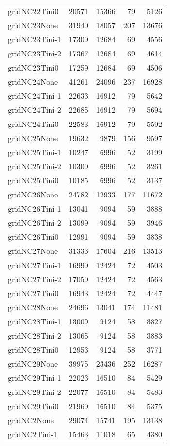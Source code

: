 \begin{longtable}{lrrrr}
gridNC22Tini0 & 20571 & 15366 & 79 & 5126 \\
gridNC23None & 31940 & 18057 & 207 & 13676 \\
gridNC23Tini-1 & 17309 & 12684 & 69 & 4556 \\
gridNC23Tini-2 & 17367 & 12684 & 69 & 4614 \\
gridNC23Tini0 & 17259 & 12684 & 69 & 4506 \\
gridNC24None & 41261 & 24096 & 237 & 16928 \\
gridNC24Tini-1 & 22633 & 16912 & 79 & 5642 \\
gridNC24Tini-2 & 22685 & 16912 & 79 & 5694 \\
gridNC24Tini0 & 22583 & 16912 & 79 & 5592 \\
gridNC25None & 19632 & 9879 & 156 & 9597 \\
gridNC25Tini-1 & 10247 & 6996 & 52 & 3199 \\
gridNC25Tini-2 & 10309 & 6996 & 52 & 3261 \\
gridNC25Tini0 & 10185 & 6996 & 52 & 3137 \\
gridNC26None & 24782 & 12933 & 177 & 11672 \\
gridNC26Tini-1 & 13041 & 9094 & 59 & 3888 \\
gridNC26Tini-2 & 13099 & 9094 & 59 & 3946 \\
gridNC26Tini0 & 12991 & 9094 & 59 & 3838 \\
gridNC27None & 31333 & 17604 & 216 & 13513 \\
gridNC27Tini-1 & 16999 & 12424 & 72 & 4503 \\
gridNC27Tini-2 & 17059 & 12424 & 72 & 4563 \\
gridNC27Tini0 & 16943 & 12424 & 72 & 4447 \\
gridNC28None & 24696 & 13041 & 174 & 11481 \\
gridNC28Tini-1 & 13009 & 9124 & 58 & 3827 \\
gridNC28Tini-2 & 13065 & 9124 & 58 & 3883 \\
gridNC28Tini0 & 12953 & 9124 & 58 & 3771 \\
gridNC29None & 39975 & 23436 & 252 & 16287 \\
gridNC29Tini-1 & 22023 & 16510 & 84 & 5429 \\
gridNC29Tini-2 & 22077 & 16510 & 84 & 5483 \\
gridNC29Tini0 & 21969 & 16510 & 84 & 5375 \\
gridNC2None & 29074 & 15741 & 195 & 13138 \\
gridNC2Tini-1 & 15463 & 11018 & 65 & 4380 \\

\end{longtable}
